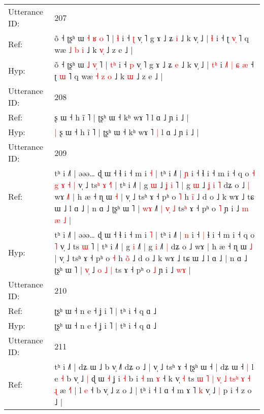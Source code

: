 \documentclass[10pt]{article}
\DeclareRobustCommand{\hl}[1]{{\textcolor{red}{#1}}}
\begin{document}
\begin{longtable}{ll}
 \\
\midrule
Utterance ID: & 207 \\
Ref: & õ ˧ ʈʂʰ ɯ \hl{˧} \hl{ʁ}\hl{ }\hl{o} ˥ | \hl{}\hl{ɬ} i ˧ \hl{ʈ} v̩ ˥ g ɤ ˩ ʑ \hl{i} ˩ k v̩ ˩ | \hl{}\hl{ɬ} i\hl{}\hl{}\hl{}\hl{}\hl{}\hl{}\hl{}\hl{}\hl{} ˧ ʈ \hl{v}\hl{̩} ˥ q wæ \hl{˩} \hl{b} \hl{i} ˩ k \hl{v}\hl{̩} ˩ z e ˩ |
 \\
Hyp: & õ ˧ ʈʂʰ ɯ \hl{˩} \hl{}\hl{v}\hl{̩} ˥ | \hl{t}\hl{ʰ} i ˧ \hl{p} v̩ ˥ g ɤ ˩ ʑ \hl{e} ˩ k v̩ ˩ | \hl{t}\hl{ʰ} i\hl{ }\hl{˩}\hl{˥}\hl{ }\hl{|}\hl{ }\hl{ɕ}\hl{ }\hl{æ} ˧ ʈ \hl{}\hl{ɯ} ˥ q wæ \hl{˧} \hl{z} \hl{o} ˩ k \hl{}\hl{ɯ} ˩ z e ˩ |
 \\
\midrule
Utterance ID: & 208 \\
Ref: & \hl{}\hl{}ʂ ɯ ˧ h ĩ ˥ | ʈʂʰ ɯ ˧ kʰ wɤ ˥\hl{}\hl{} l ɑ ˩ ɲ i ˩ |
 \\
Hyp: & \hl{|}\hl{ }ʂ ɯ ˧ h ĩ ˥ | ʈʂʰ ɯ ˧ kʰ wɤ ˥\hl{ }\hl{|} l ɑ ˩ ɲ i ˩ |
 \\
\midrule
Utterance ID: & 209 \\
Ref: & tʰ i ˩˥ | əəə… ɖ ɯ ˧ ɬ i ˧ m i \hl{˧} | tʰ i ˩˥ | \hl{ɲ} i ˧\hl{}\hl{} ɬ i ˧ m i ˧ q o\hl{ }\hl{˧}\hl{ }\hl{g}\hl{ }\hl{ɤ}\hl{ }\hl{˧} \hl{|} v̩ ˩ ts\hl{ʰ} \hl{ɤ} \hl{˧}˥ | tʰ i ˩˥ | g \hl{ɯ} ˩\hl{ }\hl{ʝ}\hl{ }\hl{i}\hl{ }˥ | g \hl{ɯ} ˩\hl{ }\hl{ʝ}\hl{ }\hl{i} \hl{˥} dʑ o ˩\hl{ }\hl{|} wɤ\hl{ }\hl{˩}\hl{˥} | h æ ˧ ɳ ɯ \hl{˧} | v̩ ˩ tsʰ ɤ ˧ pʰ o \hl{˥} h \hl{i}̃ ˩ d o ˩ k wɤ ˩ tɕ ɯ ˩ l ɑ ˩ | n ɑ ˩ ʈʂʰ ɯ ˥ | \hl{w}\hl{ɤ} ˩\hl{˥} \hl{|} \hl{v}\hl{̩} \hl{˩} ts\hl{ʰ} ɤ ˧ pʰ o \hl{˥} ɲ i ˩\hl{ }\hl{m} \hl{æ}\hl{ }\hl{˩} |
 \\
Hyp: & tʰ i ˩˥ | əəə… ɖ ɯ ˧ ɬ i ˧ m i \hl{˥} | tʰ i ˩˥ | \hl{n} i ˧\hl{ }\hl{|} ɬ i ˧ m i ˧ q o\hl{}\hl{}\hl{}\hl{}\hl{}\hl{}\hl{}\hl{} \hl{˥} v̩ ˩ ts\hl{} \hl{ɯ} \hl{}˥ | tʰ i ˩˥ | g \hl{i} ˩\hl{}\hl{}\hl{}\hl{}\hl{}˥ | g \hl{i} ˩\hl{}\hl{}\hl{}\hl{˥} \hl{|} dʑ o ˩\hl{}\hl{} wɤ\hl{}\hl{}\hl{} | h æ ˧ ɳ ɯ \hl{˩} | v̩ ˩ tsʰ ɤ ˧ pʰ o \hl{˧} h \hl{o}̃ ˩ d o ˩ k wɤ ˩ tɕ ɯ ˩ l ɑ ˩ | n ɑ ˩ ʈʂʰ ɯ ˥ | \hl{v}\hl{̩} ˩\hl{} \hl{o} \hl{}\hl{˩} \hl{|} ts\hl{} ɤ ˧ pʰ o \hl{˩} ɲ i ˩\hl{}\hl{} \hl{}\hl{w}\hl{ɤ} |
 \\
\midrule
Utterance ID: & 210 \\
Ref: & ʈʂʰ ɯ ˧ n e ˧ ʝ i ˥ | tʰ i ˧ q ɑ ˩
 \\
Hyp: & ʈʂʰ ɯ ˧ n e ˧ ʝ i ˥ | tʰ i ˧ q ɑ ˩
 \\
\midrule
Utterance ID: & 211 \\
Ref: & tʰ i ˩˥ | dʑ ɯ ˩ b v̩ ˩˥\hl{}\hl{} dʑ o ˩ |\hl{}\hl{} v̩ ˩ tsʰ ɤ ˧ ʈʂʰ ɯ ˧ | dʑ ɯ ˧\hl{ }\hl{|} l e \hl{˧} b v̩ ˩\hl{ }\hl{|} ɖ ɯ \hl{˧} ʝ i \hl{˧} b i \hl{˧} m \hl{ɤ} ˧ k v̩ \hl{˧} ts\hl{ }\hl{ɯ}\hl{ }\hl{˥} \hl{|} \hl{v}\hl{̩}\hl{ }\hl{˩} \hl{t}\hl{s}\hl{ʰ} \hl{ɤ}\hl{ }\hl{˧} \hl{ɻ}\hl{ }æ \hl{˧}˥ | l \hl{e} ˧ b v̩ ˩ z o ˩ | tʰ i ˧ l ɑ ˧ m ɤ ˥ \hl{k} v̩ ˩ \hl{|} p i ˧ z o ˩ |

\end{longtable}
\end{document}
